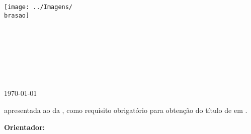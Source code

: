 

\thispagestyle{empty}
\begin{center}
	\texttt{[image: ../Imagens/\\brasao]} \\
	{\Large \textsc{\universidade}} \\
	{\large \textsc{\centro}} \\
	{\large \textsc{\departamento}} \\
	{\large \textsc{\programa}} \\
	\vspace{35mm}
	{\LARGE \textsc{\titulo}} \\
	\vspace{60mm}
	{\large \textsc{\autor}} \\
	\vspace{10mm}
	{\large \textsc{\local}} \\
	\today
\end{center}

\newpage

\begin{center}
	{\LARGE \textsc{\autor}}
\end{center}

\vspace{35mm}
\noindent{\Large \textsc{\titulo}}
\vspace{40mm}

\begin{flushright}
	\begin{minipage}{80mm}
		\manuscrito{} apresentada ao \programa{} da \universidade{}, como requisito obrigatório para obtenção do título de \graduacao{} em \curso. 
		\begin{flushright} \textbf{Orientador:} \orientador \end{flushright}
	\end{minipage}
\end{flushright}
\vspace{60mm}

